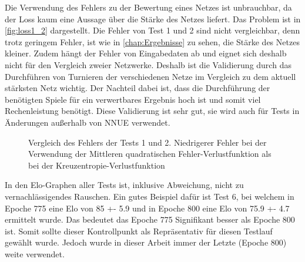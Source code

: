 Die Verwendung des Fehlers zu der Bewertung eines Netzes ist unbrauchbar, da der Loss kaum eine Aussage über die Stärke des Netzes liefert. Das Problem ist in \autoref{fig:loss1_2} dargestellt. Die Fehler von Test 1 und 2 sind nicht vergleichbar, denn trotz geringem Fehler, ist wie in \autoref{chap:Ergebnisse} zu sehen, die Stärke des Netzes kleiner. Zudem hängt der Fehler von Eingabedaten ab und eignet sich deshalb nicht für den Vergleich zweier Netzwerke. Deshalb ist die Validierung durch das Durchführen von Turnieren der verschiedenen Netze im Vergleich zu dem aktuell stärksten Netz wichtig. Der Nachteil dabei ist, dass die Durchführung der benötigten Spiele für ein verwertbares Ergebnis hoch ist und somit viel Rechenleistung benötigt. Diese Validierung ist sehr gut, sie wird auch für Tests in Änderungen außerhalb von \ac{NNUE} verwendet.

\begin{figure}
  \centering
  \caption{Vergleich des Fehlers der Tests 1 und 2. Niedrigerer Fehler bei der Verwendung der Mittleren quadratischen Fehler-Verlustfunktion als bei der Kreuzentropie-Verlustfunktion}
  \label{fig:loss1_2}
\end{figure}

In den Elo-Graphen aller Tests ist, inklusive Abweichung, nicht zu vernachlässigendes Rauschen. Ein gutes Beispiel dafür ist Test 6, bei welchem in Epoche 775 eine Elo von 85 +- 5.9 und in Epoche 800 eine Elo von 75.9 +- 4.7 ermittelt wurde. Das bedeutet das Epoche 775 Signifikant besser als Epoche 800 ist. Somit sollte dieser Kontrollpunkt als Repräsentativ für diesen Testlauf gewählt wurde. Jedoch wurde in dieser Arbeit immer der Letzte (Epoche 800) weite verwendet.

